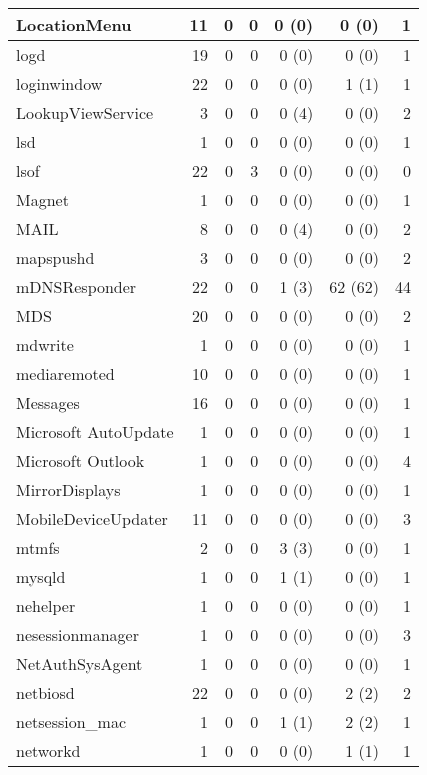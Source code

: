 \begin{adjustwidth}{-2in}{}
\begin{scriptsize}
\begin{longtable}[l]{ l | r | r | r | r | r | r }
    LocationMenu &  11 &  0 &  0 &  0 (0) &  0 (0) &  1 \\ \hline
    logd &  19 &  0 &  0 &  0 (0) &  0 (0) &  1 \\ \hline
    loginwindow & 22 &  0 &  0 &  0 (0) &  1 (1) &  1 \\ \hline
    LookupViewService &  3 &  0 &  0 &  0 (4) &  0 (0) &  2 \\ \hline
    lsd &  1 &  0 &  0 &  0 (0) &  0 (0) &  1 \\ \hline
    lsof &  22 &  0 &  3 &  0 (0) &  0 (0) &  0 \\ \hline
    Magnet & 1 &  0 &  0 &  0 (0) &  0 (0) &  1 \\ \hline
    MAIL & 8 &  0 &  0 &  0 (4) &  0 (0) &  2 \\ \hline
    mapspushd &  3 &  0 &  0 &  0 (0) &  0 (0) &  2 \\ \hline
    mDNSResponder & 22 &  0 &  0 &  1 (3) &  62 (62) & 44 \\ \hline
    MDS & 20 &  0 &  0 &  0 (0) &  0 (0) &  2 \\ \hline
    mdwrite &  1 &  0 &  0 &  0 (0) &  0 (0) &  1 \\ \hline
    mediaremoted &  10 &  0 &  0 &  0 (0) &  0 (0) &  1 \\ \hline
    Messages &  16 &  0 &  0 &  0 (0) &  0 (0) &  1 \\ \hline
    Microsoft AutoUpdate &  1 &  0 &  0 &  0 (0) &  0 (0) &  1 \\ \hline
    Microsoft Outlook & 1 &  0 &  0 &  0 (0) &  0 (0) &  4 \\ \hline
    MirrorDisplays & 1 &  0 &  0 &  0 (0) &  0 (0) &  1 \\ \hline
    MobileDeviceUpdater & 11 &  0 &  0 &  0 (0) &  0 (0) &  3 \\ \hline
    mtmfs &  2 &  0 &  0 &  3 (3) &  0 (0) &  1 \\ \hline
    mysqld & 1 &  0 &  0 &  1 (1) &  0 (0) &  1 \\ \hline
    nehelper & 1 &  0 &  0 &  0 (0) &  0 (0) &  1 \\ \hline
    nesessionmanager & 1 &  0 &  0 &  0 (0) &  0 (0) &  3 \\ \hline
    NetAuthSysAgent &  1 &  0 &  0 &  0 (0) &  0 (0) &  1 \\ \hline
    netbiosd &  22 &  0 &  0 &  0 (0) &  2 (2) &  2 \\ \hline
    netsession\_mac & 1 &  0 &  0 &  1 (1) &  2 (2) &  1 \\ \hline
    networkd & 1 &  0 &  0 &  0 (0) &  1 (1) &  1 \\ \hline

\end{longtable}
\end{scriptsize}
\end{adjustwidth}

